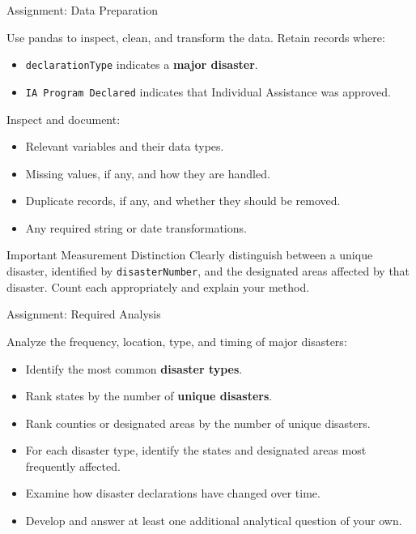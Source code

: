 \documentclass[11pt,aspectratio=43]{beamer}
\begin{document}
{\begin{frame}{Assignment: Data Preparation}
  \small

  Use pandas to inspect, clean, and transform the data. Retain records where:

  \begin{itemize}
    \item \texttt{declarationType} indicates a \textbf{major disaster}.
    \item \texttt{IA Program Declared} indicates that Individual Assistance was approved.
  \end{itemize}

  Inspect and document:

  \begin{itemize}
    \item Relevant variables and their data types.
    \item Missing values, if any, and how they are handled.
    \item Duplicate records, if any, and whether they should be removed.
    \item Any required string or date transformations.
  \end{itemize}

  \begin{block}{Important Measurement Distinction}
    Clearly distinguish between a unique disaster, identified by
    \texttt{disasterNumber}, and the designated areas affected by that
    disaster. Count each appropriately and explain your method.
  \end{block}
\end{frame}


\begin{frame}{Assignment: Required Analysis}
  \small

  Analyze the frequency, location, type, and timing of major disasters:

  \begin{itemize}
    \item Identify the most common \textbf{disaster types}.
    \item Rank states by the number of \textbf{unique disasters}.
    \item Rank counties or designated areas by the number of unique disasters.
    \item For each disaster type, identify the states and designated areas most frequently affected.
    \item Examine how disaster declarations have changed over time.
    \item Develop and answer at least one additional analytical question of your own.
  \end{itemize}


\end{frame}}
\end{document}
